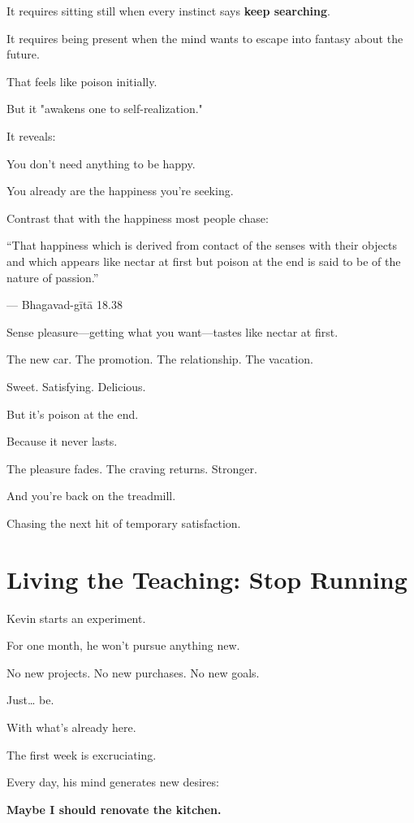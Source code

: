 \documentclass[11pt,twoside]{book}
\begin{document}
It requires sitting still when every instinct says \textbf{keep searching}.

It requires being present when the mind wants to escape into fantasy about the future.

That feels like poison initially.

But it "awakens one to self-realization."

It reveals:

You don't need anything to be happy.

You already are the happiness you're seeking.

Contrast that with the happiness most people chase:

\begin{pullquote}
``That happiness which is derived from contact of the senses with their objects and which appears like nectar at first but poison at the end is said to be of the nature of passion.''

--- Bhagavad-gītā 18.38
\end{pullquote}

Sense pleasure—getting what you want—tastes like nectar at first.

The new car. The promotion. The relationship. The vacation.

Sweet. Satisfying. Delicious.

But it's poison at the end.

Because it never lasts.

The pleasure fades. The craving returns. Stronger.

And you're back on the treadmill.

Chasing the next hit of temporary satisfaction.

\section*{Living the Teaching: Stop Running}

Kevin starts an experiment.

For one month, he won't pursue anything new.

No new projects. No new purchases. No new goals.

Just\ldots{} be.

With what's already here.

The first week is excruciating.

Every day, his mind generates new desires:

\textbf{Maybe I should renovate the kitchen.}
\end{document}
